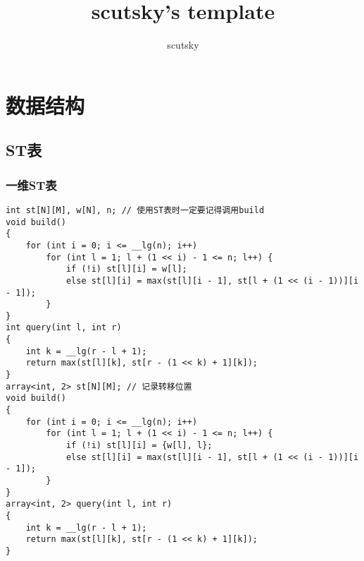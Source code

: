 \documentclass[a4paper, fontset=none]{ctexart}
\title{scutsky's template}
\author{scutsky}
\date{}
\begin{document}
\small
\begin{titlepage}
\maketitle
\end{titlepage}

\pagestyle{empty}
\renewcommand{\contentsname}{目录}
\tableofcontents %
\newpage
\pagestyle{fancy}
\setcounter{page}{1}   %

\section{数据结构}
\subsection{ST表}
\subsubsection{一维ST表}
\begin{verbatim}
int st[N][M], w[N], n; // 使用ST表时一定要记得调用build
void build()
{
    for (int i = 0; i <= __lg(n); i++)
        for (int l = 1; l + (1 << i) - 1 <= n; l++) {
            if (!i) st[l][i] = w[l];
            else st[l][i] = max(st[l][i - 1], st[l + (1 << (i - 1))][i - 1]);
        }
}
int query(int l, int r)
{
    int k = __lg(r - l + 1);
    return max(st[l][k], st[r - (1 << k) + 1][k]);
}
array<int, 2> st[N][M]; // 记录转移位置
void build()
{
    for (int i = 0; i <= __lg(n); i++)
        for (int l = 1; l + (1 << i) - 1 <= n; l++) {
            if (!i) st[l][i] = {w[l], l};
            else st[l][i] = max(st[l][i - 1], st[l + (1 << (i - 1))][i - 1]);
        }
}
array<int, 2> query(int l, int r)
{
    int k = __lg(r - l + 1);
    return max(st[l][k], st[r - (1 << k) + 1][k]);
}
\end{verbatim}
\end{document}
